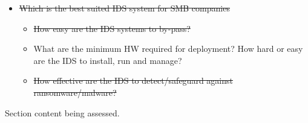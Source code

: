 \begin{notes}

    \begin{itemize}
        \item \sout{Which is the best suited IDS system for SMB companies}
        \begin{itemize}
            \item \sout{How easy are the IDS systems to by-pass?}
            \item What are the minimum HW required for deployment? How hard or easy are the IDS to install, run and manage?
            \item \sout{How effective are the IDS to detect/safeguard against ransomware/malware?}
        \end{itemize}

    \end{itemize}
    
    Section content being assessed.
    
\end{notes}







